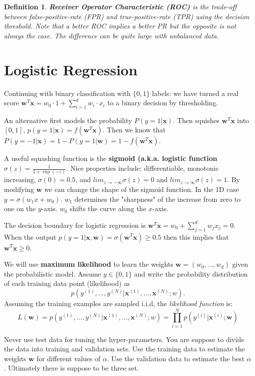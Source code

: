 \documentclass[twoside]{article}
\newtheorem{definition}[theorem]{Definition}
\newcommand\x{\mathbf{x}}
\newcommand\w{\mathbf{w}}
\begin{document}
\begin{definition}
\textbf{Receiver Operator Characteristic (ROC)} is the trade-off between false-positive-rate (FPR) and true-positive-rate (TPR) using the decision threshold. Note that a better ROC implies a better PR but the opposite is not always the case. The difference can be quite large with unbalanced data.
\end{definition}

\section{Logistic Regression}
Continuing with binary classification with $\{0,1\}$ labels: we have turned a real score $\w^T\x = w_0\cdot 1 + \sum_{i=1}^{d}w_i \cdot x_i$ to a binary decision by thresholding.

An alternative first models the probability $P(y = 1 | \x)$. Then squishes $\w^T\x$ into $[0,1]$, $p(y = 1|\x) = f(\w^T\x)$. Then we know that $P(y = -1|\x) = 1 - P(y=1 |\w) = 1 - f(\w^T\x)$. 

A useful squashing function is the \textbf{sigmoid (a.k.a. logistic function} $\sigma(z) = \frac{1}{1 + \exp(-z)}$. Nice properties include: differentiable, monotonic increasing, $\sigma(0) = 0.5$, and $lim_{z \rightarrow -\infty} \sigma(z) = 0$ and $lim_{z \rightarrow \infty} \sigma(z) = 1$. By modifying $\w$ we can change the shape of the sigmoid function. In the 1D case $y = \sigma(w_1 x + w_0)$. $w_1$ determines the "sharpness" of the increase from zero to one on the $y$-axis. $w_0$ shifts the curve along the $x$-axis.

The decision boundary for logistic regression is $\w^T\x = w_0 + \sum_{j=1}^{d}w_jx_j = 0$. When the output $p(y = 1| \x, \w) = \sigma(\w^T\x) \geq 0.5$ then this implies that $\w^T\x \geq 0$. 

We will use \textbf{maximum likelihood} to learn the weights $\w = (w_0, ..., w_d)$ given the probabilistic model. Assume $y \in \{0, 1\}$ and write the probability distribution of each training data point (likelihood) as 
\[p(y^{(1)}, ..., y^{(N)} | \x^{(1)}, ..., \x^{(N)}; w).\] Assuming the training examples are sampled i.i.d, the \emph{likelihood function} is:
\[L(\w) = p(y^{(1)}, ..., y^{(N)} | \x^{(1)}, ..., \x^{(N)}; w) = \prod_{i=1}^{N} p(y^{(i)}|\x^{(i)}; \w)\]

Never use test data for tuning the hyper-parameters. You are suppose to divide the data into training and validation sets. Use the training data to estimate the weights $\w$ for different values of $\alpha$. Use the validation data to estimate the best $\alpha$. Ultimately there is suppose to be three set. 
\end{document}
